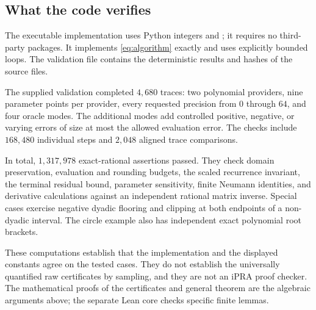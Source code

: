 \subsection{What the code verifies}

The executable implementation uses Python integers and
; it requires no third-party
packages. It implements \eqref{eq:algorithm} exactly and
uses explicitly bounded loops. The validation file contains
the deterministic results and hashes of the source files.

The supplied validation completed \(4{,}680\) traces:
two polynomial providers, nine parameter points per
provider, every requested precision from \(0\) through
\(64\), and four oracle modes. The additional modes add
controlled positive, negative, or varying errors of
size at most the allowed evaluation error.
The checks include \(168{,}480\) individual steps and
\(2{,}048\) aligned trace comparisons.

In total, \(1{,}317{,}978\) exact-rational assertions passed.
They check domain preservation, evaluation and rounding
budgets, the scaled recurrence invariant, the terminal
residual bound, parameter sensitivity, finite Neumann
identities, and derivative calculations against an
independent rational matrix inverse. Special cases exercise
negative dyadic flooring and clipping at both endpoints
of a non-dyadic interval. The circle example also has
independent exact polynomial root brackets.

These computations establish that the implementation and
the displayed constants agree on the tested cases.
They do not establish the universally quantified raw
certificates by sampling, and they are not an iPRA proof
checker. The mathematical proofs of the certificates
and general theorem are the algebraic arguments above;
the separate Lean core checks specific finite lemmas.
